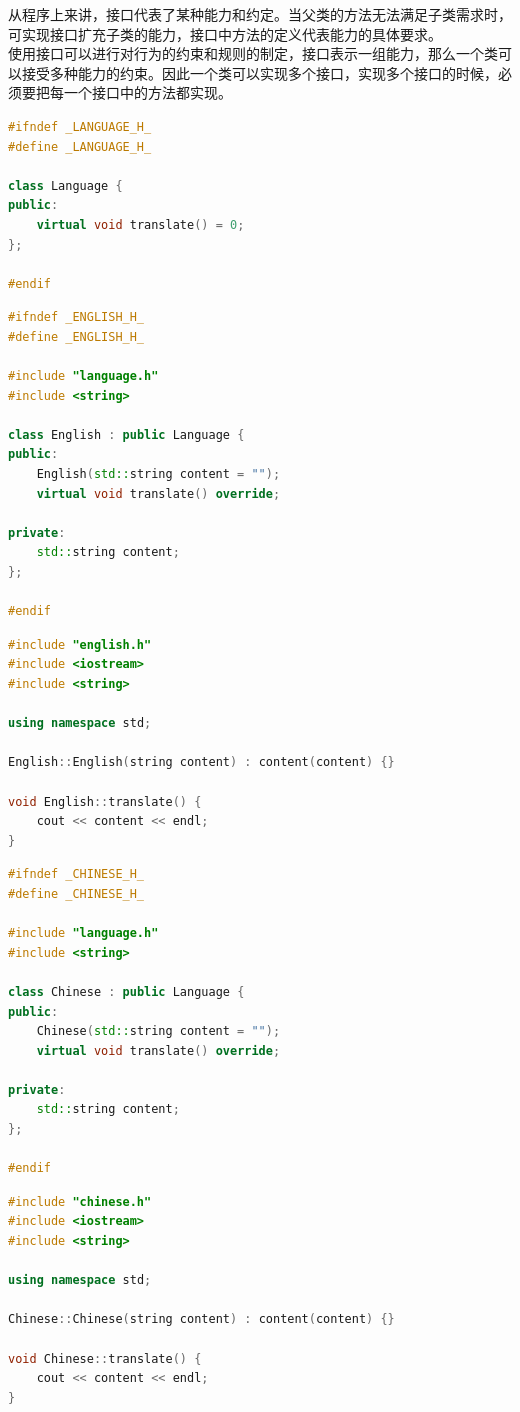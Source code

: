 从程序上来讲，接口代表了某种能力和约定。当父类的方法无法满足子类需求时，可实现接口扩充子类的能力，接口中方法的定义代表能力的具体要求。 \\

使用接口可以进行对行为的约束和规则的制定，接口表示一组能力，那么一个类可以接受多种能力的约束。因此一个类可以实现多个接口，实现多个接口的时候，必须要把每一个接口中的方法都实现。 \\


\begin{lstlisting}[language=C++, title=language.h]
#ifndef _LANGUAGE_H_
#define _LANGUAGE_H_

class Language {
public:
	virtual void translate() = 0;
};

#endif
\end{lstlisting}

\begin{lstlisting}[language=C++, title=english.h]
#ifndef _ENGLISH_H_
#define _ENGLISH_H_

#include "language.h"
#include <string>

class English : public Language {
public:
	English(std::string content = "");
	virtual void translate() override;

private:
	std::string content;
};

#endif
\end{lstlisting}

\begin{lstlisting}[language=C++, title=english.cpp]
#include "english.h"
#include <iostream>
#include <string>

using namespace std;

English::English(string content) : content(content) {}

void English::translate() {
	cout << content << endl;
}
\end{lstlisting}

\begin{lstlisting}[language=C++, title=chinese.h]
#ifndef _CHINESE_H_
#define _CHINESE_H_

#include "language.h"
#include <string>

class Chinese : public Language {
public:
	Chinese(std::string content = "");
	virtual void translate() override;

private:
	std::string content;
};

#endif
\end{lstlisting}

\begin{lstlisting}[language=C++, title=chinese.cpp]
#include "chinese.h"
#include <iostream>
#include <string>

using namespace std;

Chinese::Chinese(string content) : content(content) {}

void Chinese::translate() {
	cout << content << endl;
}
\end{lstlisting}

